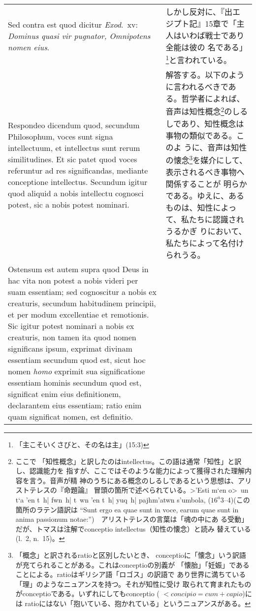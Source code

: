 \documentclass[10pt]{jsarticle} %
\begin{document}
\begin{longtable}{p{21em}p{21em}}
\\



{\sc Sed contra est} quod dicitur {\it Exod}.\ {\sc xv}: {\it Dominus quasi vir pugnator, Omnipotens nomen eius}.

&
しかし反対に、『出エジプト記』15章で「主人はいわば戦士であり全能は彼の
 名である」\footnote{「主こそいくさびと、その名は主」(15:3)}と言われている。
\\



{\sc Respondeo dicendum} quod, secundum Philosophum, voces sunt
signa intellectuum, et intellectus sunt rerum similitudines. Et sic
patet quod voces referuntur ad res significandas, mediante conceptione
intellectus. Secundum igitur quod aliquid a nobis intellectu cognosci
potest, sic a nobis potest nominari. 

&

解答する。以下のように言われるべきである。哲学者によれば、音声は知性概念\footnote{ここで
 「知性概念」と訳したのはintellectus。この語は通常「知性」と訳し、認識能力を
 指すが、ここではそのような能力によって獲得された理解内容を言う。音声が精
 神のうちにある概念のしるしであるという思想は、アリストテレスの『命題論』
 冒頭の箇所で述べられている。\foreignlanguage{greek}{>'Esti m`en o>~un
 t`a 'en t~h| fwn~h| t~wn 'en t~h| yuq~h| pajhm'atwn s'umbola,}
 ($16^a3$--4)(この箇所のラテン語訳は ``Sunt ergo ea quae sunt in voce, earum quae
 sunt in anima passionum notae:'')　アリストテレスの言葉は「魂の中にあ
 る受動」だが、トマスは注解でconceptio intellectus（知性の懐念）と読み
 替えている(l.~2, n.~15)。}のしるしであり、知性概念は事物の類似である。このよ
 うに、音声は知性の懐念\footnote{「概念」と訳されるratioと区別したいとき、
 conceptioに「懐念」いう訳語が充てられることがある。これはconceptioの別義が
 「懐胎」「妊娠」であることによる。ratioはギリシア語「ロゴス」の訳語で
 あり世界に満ちている「理」のようなニュアンスを持つ。それが知性に受け
 取られて育まれたものがconceptioである。いずれにしてもconceptio
 ( $< concipio = cum + capio$)には
 ratioにはない「抱いている、抱かれている」というニュアンスがある。}を媒介にして、表示されるべき事物へ関係することが
 明らかである。ゆえに、あるものは、知性によって、私たちに認識されうるかぎ
 りにおいて、私たちによって名付けられうる。

\\

Ostensum est autem supra quod Deus
in hac vita non potest a nobis videri per suam essentiam; sed
cognoscitur a nobis ex creaturis, secundum habitudinem principii, et per
modum excellentiae et remotionis. Sic igitur potest nominari a nobis ex
creaturis, non tamen ita quod nomen significans ipsum, exprimat divinam
essentiam secundum quod est, sicut hoc nomen {\it homo} exprimit sua
significatione essentiam hominis secundum quod est, significat enim eius
definitionem, declarantem eius essentiam; ratio enim quam significat
nomen, est definitio.


\end{longtable}
\end{document}
